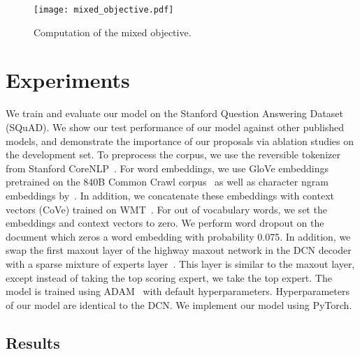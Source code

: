 \documentclass{article} \usepackage{iclr2018_conference,times}
\newcommand{\squad}{SQuAD\xspace}
\begin{document}
\begin{figure}[t!] 
\begin{center}
	\texttt{[image: mixed\_objective.pdf]}
  \end{center}
  \vspace{-2mm}
  \caption{
  Computation of the mixed objective.
}\label{fig:mixed_objective}
  \vspace{-2mm}
\end{figure}


\section{Experiments}
\vspace{-2mm}

We train and evaluate our model on the Stanford Question Answering Dataset (\squad).
We show our test performance of our model against other published models, and demonstrate the importance of our proposals via ablation studies on the development set.
To preprocess the corpus, we use the reversible tokenizer from Stanford CoreNLP~\citep{Manning2014TheSC}.
For word embeddings, we use GloVe embeddings pretrained on the 840B Common Crawl corpus~\citep{Pennington2014GloveGV} as well as character ngram embeddings by~\citet{Hashimoto2017AJM}.
In addition, we concatenate these embeddings with context vectors (CoVe) trained on WMT~\citep{McCann2017Learned}.
For out of vocabulary words, we set the embeddings and context vectors to zero.
We perform word dropout on the document which zeros a word embedding with probability 0.075.
In addition, we swap the first maxout layer of the highway maxout network in the DCN decoder with a sparse mixture of experts layer~\citep{shazeer2017outrageously}.
This layer is similar to the maxout layer, except instead of taking the top scoring expert, we take the top  expert.
The model is trained using ADAM~\citep{Kingma2014AdamAM} with default hyperparameters.
Hyperparameters of our model are identical to the DCN.
We implement our model using PyTorch.

 
\subsection{Results}
\end{document}
